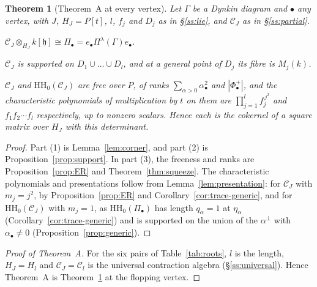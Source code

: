\documentclass[11pt]{amsart}
\numberwithin{table}{section}
\numberwithin{figure}{section}
\numberwithin{equation}{section}
\newtheorem{thm}{Theorem}[section]
\theoremstyle{definition}
\theoremstyle{plain}
\newcommand{\cC}{\mathcal{C}}
\newcommand{\h}{\mathfrak{h}}
\newcommand{\bul}{\bullet}
\newcommand{\HH}{\mathrm{HH}}
\begin{document}
\begin{thm}[Theorem~A at every vertex]\label{thm:Avertex}
Let $\Gamma$ be a Dynkin diagram and $\bul$ any vertex, with $J$, $H_J = P[t]$, $l$, $f_j$ and $D_j$ as in \S\ref{ss:lie}, and $\cC_J$ as in \S\ref{ss:partial}.
\begin{thmlist}
\item $\cC_J \otimes_{H_J} k[\h] \cong \Pi_\bul = e_\bul\Pi^\lambda(\Gamma)e_\bul$.
\item $\cC_J$ is supported on $D_1 \cup \dots \cup D_l$, and at a general point of $D_j$ its fibre is $M_j(k)$.
\item $\cC_J$ and $\HH_0(\cC_J)$ are free over $P$, of ranks $\sum_{\alpha > 0} \alpha_\bul^2$ and $|\Phi^+_\bul|$, and the characteristic polynomials of multiplication by $t$ on them are $\prod_{j=1}^{l} f_j^{\,j^2}$ and $f_1 f_2 \cdots f_l$ respectively, up to nonzero scalars. Hence each is the cokernel of a square matrix over $H_J$ with this determinant.
\end{thmlist}
\end{thm}

\begin{proof}
Part (1) is Lemma~\ref{lem:corner}, and part (2) is Proposition~\ref{prop:support}. In part (3), the freeness and ranks are Proposition~\ref{prop:ER} and Theorem~\ref{thm:squeeze}. The characteristic polynomials and presentations follow from Lemma~\ref{lem:presentation}: for $\cC_J$ with $m_j = j^2$, by Proposition~\ref{prop:ER} and Corollary~\ref{cor:trace-generic}, and for $\HH_0(\cC_J)$ with $m_j = 1$, as $\HH_0(\Pi_\bul)$ has length $q_\alpha = 1$ at $\eta_\alpha$ (Corollary~\ref{cor:trace-generic}) and is supported on the union of the $\alpha^\perp$ with $\alpha_\bul \neq 0$ (Proposition~\ref{prop:generic}).
\end{proof}

\begin{proof}[Proof of Theorem~A]
For the six pairs of Table~\ref{tab:roots}, $l$ is the length, $H_J = H_l$ and $\cC_J = \cC_l$ is the universal contraction algebra (\S\ref{ss:universal}). Hence Theorem~A is Theorem~\ref{thm:Avertex} at the flopping vertex.
\end{proof}
\end{document}
